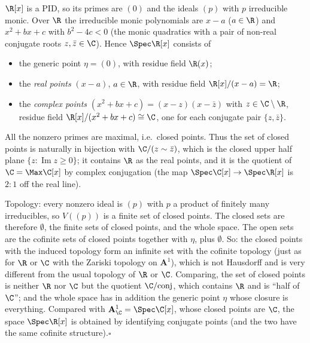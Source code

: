 \documentclass[11pt]{article}
\begin{document}
\pf
$\R[x]$ is a PID, so its primes are $(0)$ and the ideals $(p)$ with $p$ irreducible monic. Over $\R$ the irreducible monic polynomials are $x-a$ ($a\in\R$) and $x^2+bx+c$ with $b^2-4c<0$ (the monic quadratics with a pair of non-real conjugate roots $z,\bar z\in\C$). Hence $\Spec\R[x]$ consists of
\begin{itemize}
\item the generic point $\eta=(0)$, with residue field $\R(x)$;
\item the \emph{real points} $(x-a)$, $a\in\R$, with residue field $\R[x]/(x-a)=\R$;
\item the \emph{complex points} $(x^2+bx+c)=(x-z)(x-\bar z)$ with $z\in\C\setminus\R$, residue field $\R[x]/(x^2+bx+c)\cong\C$, one for each conjugate pair $\{z,\bar z\}$.
\end{itemize}
All the nonzero primes are maximal, i.e.\ closed points. Thus the set of closed points is naturally in bijection with $\C/(z\sim\bar z)$, which is the closed upper half plane $\{z:\operatorname{Im}z\ge0\}$; it contains $\R$ as the real points, and it is the quotient of $\C=\Max\C[x]$ by complex conjugation (the map $\Spec\C[x]\to\Spec\R[x]$ is $2:1$ off the real line).

Topology: every nonzero ideal is $(p)$ with $p$ a product of finitely many irreducibles, so $V((p))$ is a finite set of closed points. The closed sets are therefore $\emptyset$, the finite sets of closed points, and the whole space. The open sets are the cofinite sets of closed points together with $\eta$, plus $\emptyset$. So: the closed points with the induced topology form an infinite set with the cofinite topology (just as for $\R$ or $\C$ with the Zariski topology on $\mathbf A^1$), which is not Hausdorff and is very different from the usual topology of $\R$ or $\C$. Comparing, the set of closed points is neither $\R$ nor $\C$ but the quotient $\C/\text{conj}$, which contains $\R$ and is ``half of $\C$''; and the whole space has in addition the generic point $\eta$ whose closure is everything. Compared with $\mathbf A^1_{\C}=\Spec\C[x]$, whose closed points are $\C$, the space $\Spec\R[x]$ is obtained by identifying conjugate points (and the two have the same cofinite structure).\hfill$\square$
\end{document}
